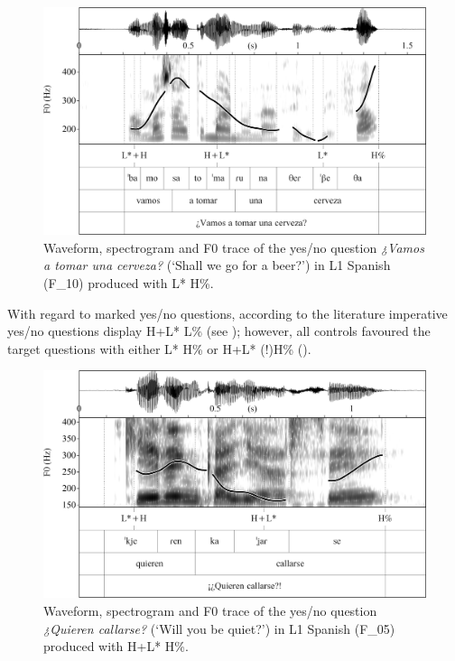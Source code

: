 \begin{figure}


\includegraphics[width=\textwidth]{figures/Figure_4.54.png}



\caption{Waveform, spectrogram and F0 trace of the yes/no question \textit{¿Vamos a tomar una cerveza?} (‘Shall we go for a beer?’) in L1 Spanish (F\_10) produced with L* H\%.}
\label{fig:4.54}
\end{figure}

With regard to marked yes/no questions, according to the literature imperative yes/no questions display H+L* L\% (see  \citealt{Estebas-VilaplanaPrieto2010}); however, all controls favoured the target questions with either L* H\% or H+L* (!)H\% ().

\begin{figure}


\includegraphics[width=\textwidth]{figures/Figure_4.55.png}



\caption{Waveform, spectrogram and F0 trace of the yes/no question \textit{¿Quieren callarse?} (‘Will you be quiet?’) in L1 Spanish (F\_05) produced with H+L* H\%.}
\label{fig:4.55}
\end{figure}

